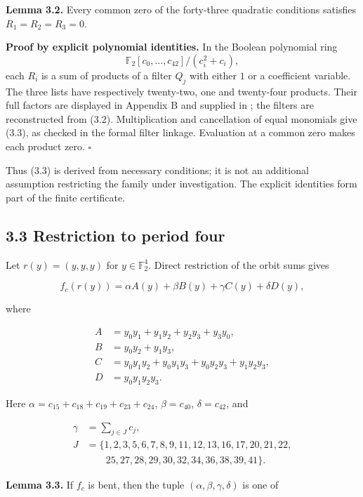 \documentclass[11pt,a4paper]{article}
\begin{document}
\textbf{Lemma 3.2.} Every common zero of the forty-three quadratic conditions satisfies $R_1=R_2=R_3=0$.

\textbf{Proof by explicit polynomial identities.} In the Boolean polynomial ring
\[\mathbb F_2[c_0,\ldots,c_{42}]/(c_i^2+c_i),\]
each $R_i$ is a sum of products of a filter $Q_j$ with either $1$ or a coefficient variable. The three lists have respectively twenty-two, one and twenty-four products. Their full factors are displayed in Appendix B and supplied in ; the filters are reconstructed from (3.2). Multiplication and cancellation of equal monomials give (3.3), as checked in the formal filter linkage. Evaluation at a common zero makes each product zero. \hfill$\square$

Thus (3.3) is derived from necessary conditions; it is not an additional assumption restricting the family under investigation. The explicit identities form part of the finite certificate.

\subsection*{3.3 Restriction to period four}

Let $r(y)=(y,y,y)$ for $y\in\mathbb F_2^4$. Direct restriction of the orbit sums gives

\[
f_c(r(y))=\alpha A(y)+\beta B(y)+\gamma C(y)+\delta D(y), \tag{3.4}
\]

where

\[
\begin{aligned}
A&=y_0y_1+y_1y_2+y_2y_3+y_3y_0,\\
B&=y_0y_2+y_1y_3,\\
C&=y_0y_1y_2+y_0y_1y_3+y_0y_2y_3+y_1y_2y_3,\\
D&=y_0y_1y_2y_3.
\end{aligned}
\]

Here $\alpha=c_{15}+c_{18}+c_{19}+c_{23}+c_{24}$, $\beta=c_{40}$, $\delta=c_{42}$, and

\[
\begin{aligned}\gamma&=\sum_{j\in J}c_j,\\J&=\{1,2,3,5,6,7,8,9,11,12,13,16,17,20,21,22,\\&\qquad 25,27,28,29,30,32,34,36,38,39,41\}.\end{aligned} \tag{3.5}
\]

\textbf{Lemma 3.3.} If $f_c$ is bent, then the tuple $(\alpha,\beta,\gamma,\delta)$ is one of
\end{document}
